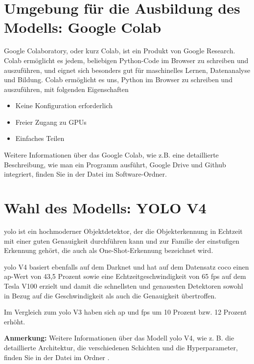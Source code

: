 \section{Umgebung für die Ausbildung des Modells: Google Colab}

Google Colaboratory, oder kurz \glqq Colab\grq, ist ein Produkt von Google Research. Colab ermöglicht es jedem, beliebigen Python-Code im Browser zu schreiben und auszuführen, und eignet sich besonders gut für maschinelles Lernen, Datenanalyse und Bildung.
Colab ermöglicht es uns, Python im Browser zu schreiben und auszuführen, mit folgenden Eigenschaften

\begin{itemize}
	\item Keine Konfiguration erforderlich
	\item Freier Zugang zu GPUs
	\item Einfaches Teilen
\end{itemize}

Weitere Informationen über das Google Colab, wie z.B. eine detaillierte Beschreibung, wie man ein Programm ausführt, Google Drive und Github integriert, finden Sie in der Datei  im Software-Ordner.

\section{Wahl des Modells: YOLO V4} 

\ac{yolo} ist ein hochmoderner Objektdetektor, der die Objekterkennung in Echtzeit mit einer guten Genauigkeit durchführen kann und zur Familie der einstufigen Erkennung gehört, die auch als One-Shot-Erkennung bezeichnet wird.

\ac{yolo} V4 basiert ebenfalls auf dem Darknet und hat auf dem Datensatz \ac{coco} einen \ac{ap}-Wert von 43,5 Prozent sowie eine Echtzeitgeschwindigkeit von 65 \ac{fps} auf dem Tesla V100 erzielt und damit die schnellsten und genauesten Detektoren sowohl in Bezug auf die Geschwindigkeit als auch die Genauigkeit übertroffen.

Im Vergleich zum \ac{yolo} V3 haben sich \ac{ap} und \ac{fps} um 10 Prozent bzw. 12 Prozent erhöht.

\textbf{Anmerkung:} Weitere Informationen über das Modell \ac{yolo} V4, wie z. B. die detaillierte Architektur, die verschiedenen Schichten und die Hyperparameter, finden Sie in der Datei  im Ordner .

